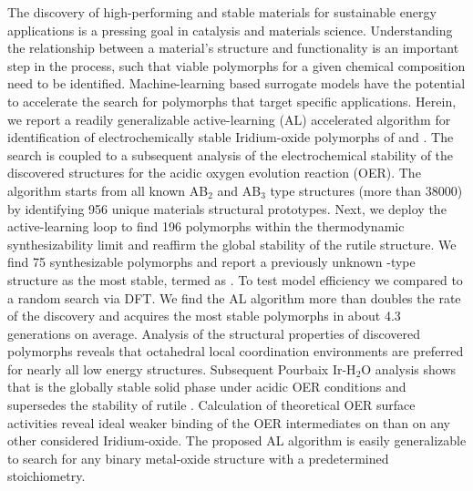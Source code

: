 %


%
\noindent The discovery of high-performing and stable materials for sustainable energy applications is a pressing goal in catalysis and materials science.
%
Understanding the relationship between a material's structure and functionality is an important step in the process, such that viable polymorphs for a given chemical composition need to be identified.
%
Machine-learning based surrogate models have the potential to accelerate the search for polymorphs that target specific applications.
%
Herein, we report a readily generalizable active-learning (AL) accelerated algorithm for identification of electrochemically stable Iridium-oxide polymorphs of \IrOtwo and \IrOthree.
%
The search is coupled to a subsequent analysis of the electrochemical stability of the discovered structures for the acidic oxygen evolution reaction (OER).
%
The algorithm starts from all known AB$_2$ and AB$_3$ type structures (more than \num{38000}) by identifying 956 unique materials structural prototypes.
%
Next, we deploy the active-learning loop to find \num{196} \IrOtwo polymorphs within the thermodynamic synthesizability limit and reaffirm the global stability of the rutile structure.
%
We find \num{75} synthesizable \IrOthree polymorphs and report a previously unknown -type structure as the most stable, termed as \aIrOthree.
%
To test model efficiency we compared to a random search via DFT.
%
We find the AL algorithm more than doubles the rate of the discovery and acquires the most stable polymorphs in about \num{4.3} generations on average.
%
Analysis of the structural properties of discovered polymorphs reveals that octahedral local coordination environments are preferred for nearly all low energy structures.
%
Subsequent Pourbaix Ir-H$_2$O analysis shows that \aIrOthree is the globally stable solid phase under acidic OER conditions and supersedes the stability of rutile \IrOtwo.
%
Calculation of theoretical OER surface activities reveal ideal weaker binding of the OER intermediates on \aIrOthree than on any other considered Iridium-oxide.
%
The proposed AL algorithm is easily generalizable to search for any binary metal-oxide structure with a predetermined stoichiometry.





